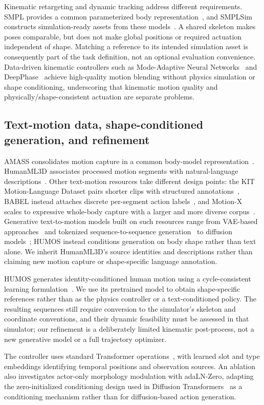 Kinematic retargeting and dynamic tracking address different requirements.
SMPL provides a common parameterized body representation~\cite{smpl}, and
SMPLSim constructs simulation-ready assets from these
models~\cite{smplsim}. A shared skeleton makes poses comparable, but does not
make global positions or required actuation independent of shape. Matching a
reference to its intended simulation asset is consequently part of the task
definition, not an optional evaluation convenience. Data-driven kinematic
controllers such as Mode-Adaptive Neural Networks~\cite{modeadaptive} and
DeepPhase~\cite{deepphase} achieve high-quality motion blending without
physics simulation or shape conditioning, underscoring that kinematic motion
quality and physically/shape-consistent actuation are separate problems.

\subsection{Text-motion data, shape-conditioned generation, and refinement}

AMASS consolidates motion capture in a common body-model
representation~\cite{amass}. HumanML3D associates processed motion segments
with natural-language descriptions~\cite{humanml3d}. Other text-motion
resources take different design points: the KIT Motion-Language Dataset
pairs shorter clips with structured annotations~\cite{kit}, BABEL instead
attaches discrete per-segment action labels~\cite{babel}, and Motion-X scales
to expressive whole-body capture with a larger and more diverse
corpus~\cite{motionx}. Generative text-to-motion models built on such
resources range from VAE-based approaches~\cite{temos} and tokenized
sequence-to-sequence generation~\cite{tm2t} to diffusion
models~\cite{mdm,motiondiffuse}; HUMOS instead conditions generation on body
shape rather than text alone. We inherit HumanML3D's source identities and
descriptions rather than claiming new motion capture or shape-specific
language annotation.

HUMOS generates identity-conditioned human motion using a cycle-consistent
learning formulation~\cite{humos}. We use its pretrained model to obtain
shape-specific references rather than as the physics controller or a
text-conditioned policy. The resulting sequences still require conversion to
the simulator's skeleton and coordinate conventions, and their dynamic
feasibility must be assessed in that simulator; our refinement is a
deliberately limited kinematic post-process, not a new generative model or a
full trajectory optimizer.

The controller uses standard Transformer operations~\cite{attention}, with
learned slot and type embeddings identifying temporal positions and
observation sources. An ablation also investigates actor-only morphology
modulation with adaLN-Zero, adapting the zero-initialized conditioning design
used in Diffusion Transformers~\cite{dit} as a conditioning mechanism rather
than for diffusion-based action generation.
